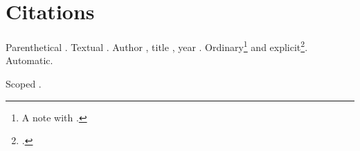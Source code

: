 \documentclass{article}
\begin{document}
\section{Citations}
Parenthetical \parencite{doe}. Textual \textcite{doe}.
Author \citeauthor{doe}, title , year \citeyear{doe}.
Ordinary\footnote{A note with \cite{roe}.} and explicit\footcite[12]{doe}.
Automatic\autocite{roe}.
\nocite{unused}
\printbibliography[title={Sources}]
\begin{refsection}
Scoped \cite{roe}.
\printbibliography[title={Section Sources}]
\end{refsection}
\end{document}
